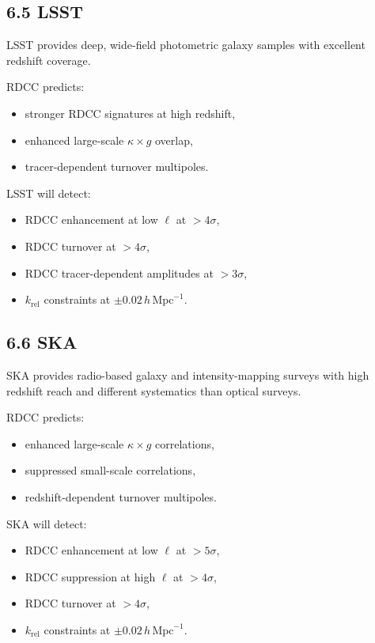 \documentclass[11pt,a4paper]{article}
\begin{document}
\subsection*{6.5 LSST}

LSST provides deep, wide-field photometric galaxy samples with excellent redshift coverage.

RDCC predicts:

\begin{itemize}
    \item stronger RDCC signatures at high redshift,
    \item enhanced large-scale $\kappa \times g$ overlap,
    \item tracer-dependent turnover multipoles.
\end{itemize}

LSST will detect:

\begin{itemize}
    \item RDCC enhancement at low $\ell$ at $>4\sigma$,
    \item RDCC turnover at $>4\sigma$,
    \item RDCC tracer-dependent amplitudes at $>3\sigma$,
    \item $k_{\mathrm{rel}}$ constraints at $\pm 0.02\,h\,\mathrm{Mpc}^{-1}$.
\end{itemize}

\subsection*{6.6 SKA}

SKA provides radio-based galaxy and intensity-mapping surveys with high redshift reach and 
different systematics than optical surveys.

RDCC predicts:

\begin{itemize}
    \item enhanced large-scale $\kappa \times g$ correlations,
    \item suppressed small-scale correlations,
    \item redshift-dependent turnover multipoles.
\end{itemize}

SKA will detect:

\begin{itemize}
    \item RDCC enhancement at low $\ell$ at $>5\sigma$,
    \item RDCC suppression at high $\ell$ at $>4\sigma$,
    \item RDCC turnover at $>4\sigma$,
    \item $k_{\mathrm{rel}}$ constraints at $\pm 0.02\,h\,\mathrm{Mpc}^{-1}$.
\end{itemize}
\end{document}
